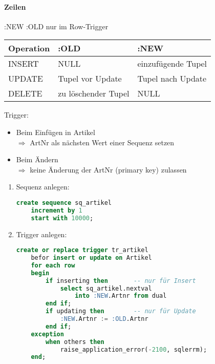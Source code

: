 \paragraph{Zeilen} :NEW :OLD nur im Row-Trigger
\begin{tabular}{l | l | l}
Operation & :OLD & :NEW\\\hline
INSERT & NULL & einzufügende Tupel\\
UPDATE & Tupel vor Update & Tupel nach Update\\
DELETE & zu löschender Tupel & NULL
\end{tabular}

Trigger:
\begin{itemize}
\item Beim Einfügen in Artikel\\
$\Rightarrow$ ArtNr als nächsten Wert einer Sequenz setzen
\item Beim Ändern\\
$\Rightarrow$ keine Änderung der ArtNr (primary key) zulassen
\end{itemize}
\begin{enumerate}
\item Sequenz anlegen:
\begin{lstlisting}[language=SQL]
create sequence sq_artikel
	increment by 1
	start with 10000;
\end{lstlisting}
\item Trigger anlegen:
\begin{lstlisting}[language=SQL]
create or replace trigger tr_artikel
	befor insert or update on Artikel
	for each row
	begin
		if inserting then		-- nur für Insert
			select sq_artikel.nextval
				into :NEW.Artnr from dual
		end if;
		if updating then		-- nur für Update
			:NEW.Artnr := :OLD.Artnr
		end if;
	exception
		when others then
			raise_application_error(-2100, sqlerrm);
	end;
\end{lstlisting}
\end{enumerate}

